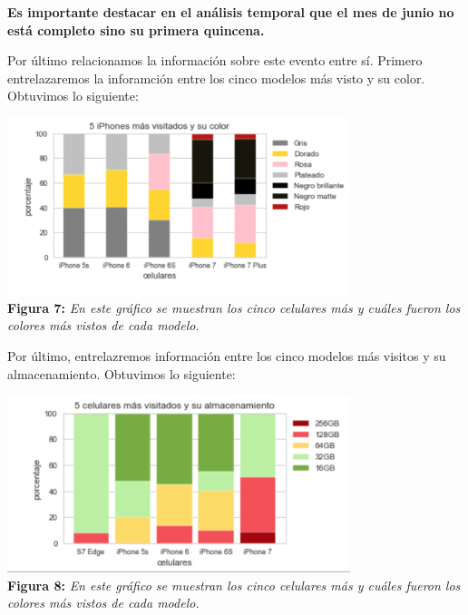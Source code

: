 \documentclass[titlepage,a4paper]{article}
\begin{document}
	\textbf{Es importante destacar en el análisis temporal que el mes de  junio no está completo sino su primera quincena. }
	
	Por último relacionamos la información sobre este evento entre sí. Primero entrelazaremos la inforamción entre los cinco modelos más visto y su color. Obtuvimos lo siguiente:

	\begin{center}
	\includegraphics[width=10cm]{cincoModMasVisitadosColor.jpg}\\
	\textbf{Figura 7:}  \textit{En este gráfico se muestran los cinco celulares más y cuáles fueron los colores más vistos de cada modelo. }
	\end{center}
	Por último, entrelazremos información entre los cinco modelos más visitos y su almacenamiento. Obtuvimos lo siguiente: 
	\begin{center}
	\includegraphics[width=10cm] {cincoModMasVisitadosAlmacenamiento.jpg}\\
	\textbf{Figura 8:}  \textit{En este gráfico se muestran los cinco celulares más y cuáles fueron los colores más vistos de cada modelo. }
	\end{center}
	
\end{document}
